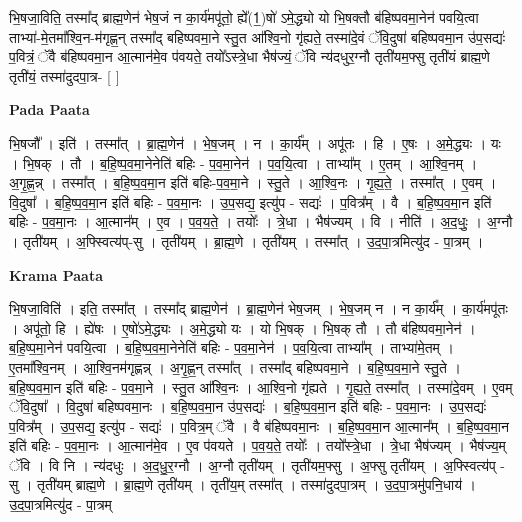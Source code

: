 \documentclass[17pt]{extarticle}
\begin{document}
भि॒षजा॒विति॒ तस्मा᳚द् ब्राह्म॒णेन॑ भेष॒जं न का॒र्य॑मपू॑तो॒ ह्ये᳚(1॒)षो॑ ऽमे॒द्ध्यो यो भि॒षक्तौ ब॑हिष्पवमा॒नेन॑ पवयि॒त्वा ताभ्या॑-मे॒तमा᳚श्वि॒न-म॑गृह्ण॒न् तस्मा᳚द् बहिष्पवमा॒ने स्तु॒त आ᳚श्वि॒नो गृ॑ह्यते॒ तस्मा॑दे॒वं ॅवि॒दुषा॑ बहिष्पवमा॒न उ॑प॒सद्यः॑ प॒वित्रं॒ ॅवै ब॑हिष्पवमा॒न आ॒त्मान॑मे॒व प॑वयते॒ तयो᳚ऽस्त्रे॒धा भैष॑ज्यं॒ ॅवि न्य॑दधुर॒ग्नौ तृती॑यम॒फ्सु तृती॑यं ब्राह्म॒णे तृती॑यं॒ तस्मा॑दुदपा॒त्र- [  ] \newline

\textbf{Pada Paata} \newline

भि॒षजौ᳚ । इति॑ । तस्मा᳚त् । ब्रा॒ह्म॒णेन॑ । भे॒ष॒जम् । न । का॒र्य᳚म् । अपू॑तः । हि । ए॒षः । अ॒मे॒द्ध्यः । यः । भि॒षक् । तौ । ब॒हि॒ष्प॒व॒मा॒नेनेति॑ बहिः - प॒व॒मा॒नेन॑ । प॒व॒यि॒त्वा । ताभ्या᳚म् । ए॒तम् । आ॒श्वि॒नम् । अ॒गृ॒ह्ण॒न्न् । तस्मा᳚त् । ब॒हि॒ष्प॒व॒मा॒न इति॑ बहिः-प॒व॒मा॒ने । स्तु॒ते । आ॒श्वि॒नः । गृ॒ह्य॒ते॒ । तस्मा᳚त् । ए॒वम् । वि॒दुषा᳚ । ब॒हि॒ष्प॒व॒मा॒न इति॑ बहिः - प॒व॒मा॒नः । उ॒प॒सद्य॒ इत्यु॑प - सद्यः॑ । प॒वित्र᳚म् । वै । ब॒हि॒ष्प॒व॒मा॒न इति॑ बहिः - प॒व॒मा॒नः । आ॒त्मान᳚म् । ए॒व । प॒व॒य॒ते॒ । तयोः᳚ । त्रे॒धा । भैष॑ज्यम् । वि । नीति॑ । अ॒द॒धुः॒ । अ॒ग्नौ । तृती॑यम् । अ॒फ्स्वित्य॑प्-सु । तृती॑यम् । ब्रा॒ह्म॒णे । तृती॑यम् । तस्मा᳚त् । उ॒द॒पा॒त्रमित्यु॑द - पा॒त्रम् ।  \newline


\textbf{Krama Paata} \newline

भि॒षजा॒विति॑ । इति॒ तस्मा᳚त् । तस्मा᳚द् ब्राह्म॒णेन॑ । ब्रा॒ह्म॒णेन॑ भेष॒जम् । भे॒ष॒जम् न । न का॒र्य᳚म् । का॒र्य॑मपू॑तः । अपू॑तो॒ हि । ह्ये॑षः । ए॒षो॑ऽमे॒द्ध्यः । अ॒मे॒द्ध्यो यः । यो भि॒षक् । भि॒षक् तौ । तौ ब॑हिष्पवमा॒नेन॑ । ब॒हि॒ष्प॒मा॒नेन॑ पवयि॒त्वा । ब॒हि॒ष्प॒व॒मा॒नेनेति॑ बहिः - प॒व॒मा॒नेन॑ । प॒व॒यि॒त्वा ताभ्या᳚म् । ताभ्या॑मे॒तम् । ए॒तमा᳚श्वि॒नम् । आ॒श्वि॒नम॑गृह्णन्न् । अ॒गृ॒ह्ण॒न् तस्मा᳚त् । तस्मा᳚द् बहिष्पवमा॒ने । ब॒हि॒ष्प॒व॒मा॒ने स्तु॒ते । ब॒हि॒ष्प॒व॒मा॒न इति॑ बहिः - प॒व॒मा॒ने । स्तु॒त आ᳚श्वि॒नः । आ॒श्वि॒नो गृ॑ह्यते । गृ॒ह्य॒ते॒ तस्मा᳚त् । तस्मा॑दे॒वम् । ए॒वम् ॅवि॒दुषा᳚ । वि॒दुषा॑ बहिष्पवमा॒नः । ब॒हि॒ष्प॒व॒मा॒न उ॑प॒सद्यः॑ । ब॒हि॒ष्प॒व॒मा॒न इति॑ बहिः - प॒व॒मा॒नः । उ॒प॒सद्यः॑ प॒वित्र᳚म् । उ॒प॒सद्य॒ इत्यु॑प - सद्यः॑ । प॒वित्र॒म् ॅवै । वै ब॑हिष्पवमा॒नः । ब॒हि॒ष्प॒व॒मा॒न आ॒त्मान᳚म् । ब॒हि॒ष्प॒व॒मा॒न इति॑ बहिः - प॒व॒मा॒नः । आ॒त्मान॑मे॒व । ए॒व प॑वयते । प॒व॒य॒ते॒ तयोः᳚ । तयो᳚स्त्रे॒धा । त्रे॒धा भैष॑ज्यम् । भैष॑ज्य॒म् ॅवि । वि नि । न्य॑दधुः । अ॒द॒धु॒र॒ग्नौ । अ॒ग्नौ तृती॑यम् । तृती॑यम॒फ्सु । अ॒फ्सु तृती॑यम् । अ॒फ्स्वित्य॑प् - सु । तृती॑यम् ब्राह्म॒णे । ब्रा॒ह्म॒णे तृती॑यम् । तृती॑य॒म् तस्मा᳚त् । तस्मा॑दुदपा॒त्रम् । उ॒द॒पा॒त्रमु॑पनि॒धाय॑ । उ॒द॒पा॒त्रमित्यु॑द - पा॒त्रम् \newline
\end{document}
